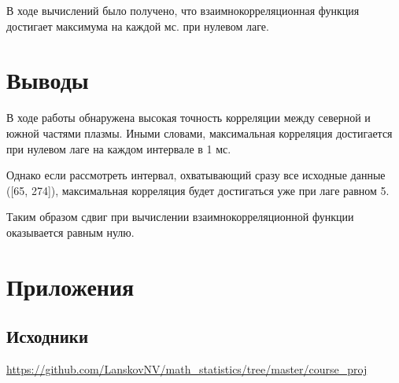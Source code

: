\documentclass[12pt]{article}
\begin{document}
В ходе вычислений было получено, что взаимнокорреляционная функция достигает максимума на каждой мс. при нулевом лаге.

\section{Выводы}

В ходе работы обнаружена высокая точность корреляции между северной и южной частями плазмы. Иными словами, максимальная корреляция достигается при нулевом лаге на каждом интервале в 1 мс. 

Однако если рассмотреть интервал, охватывающий сразу все исходные данные ([65, 274]), максимальная корреляция будет достигаться уже при лаге равном 5.

Таким образом сдвиг при вычислении взаимнокорреляционной функции оказывается равным нулю.

\section{Приложения}

\subsection{Исходники} 
\url{https://github.com/LanskovNV/math_statistics/tree/master/course_proj}
\end{document}
